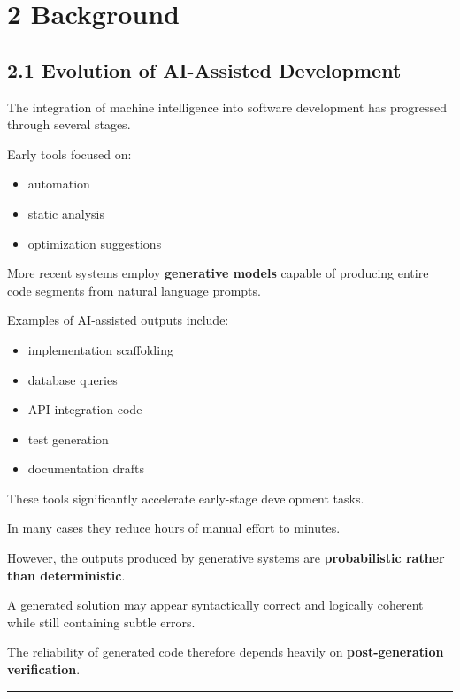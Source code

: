 \documentclass[
]{article}
\providecommand{\tightlist}{%
  \setlength{\itemsep}{0pt}\setlength{\parskip}{0pt}}
\begin{document}
\section{2 Background}\label{2-background}

\subsection{2.1 Evolution of AI-Assisted
Development}\label{21-evolution-of-ai-assisted-development}

The integration of machine intelligence into software development has
progressed through several stages.

Early tools focused on:

\begin{itemize}
\tightlist
\item
  automation
\item
  static analysis
\item
  optimization suggestions
\end{itemize}

More recent systems employ \textbf{generative models} capable of
producing entire code segments from natural language prompts.

Examples of AI-assisted outputs include:

\begin{itemize}
\tightlist
\item
  implementation scaffolding
\item
  database queries
\item
  API integration code
\item
  test generation
\item
  documentation drafts
\end{itemize}

These tools significantly accelerate early-stage development tasks.

In many cases they reduce hours of manual effort to minutes.

However, the outputs produced by generative systems are
\textbf{probabilistic rather than deterministic}.

A generated solution may appear syntactically correct and logically
coherent while still containing subtle errors.

The reliability of generated code therefore depends heavily on
\textbf{post-generation verification}.

\begin{center}\rule{0.5\linewidth}{0.5pt}\end{center}
\end{document}
